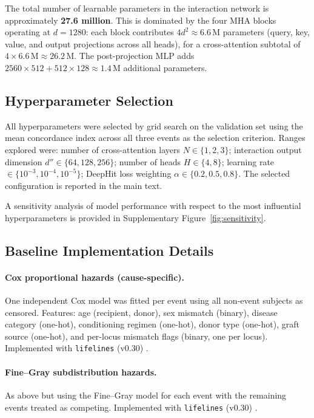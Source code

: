 \documentclass[12pt]{article}
\begin{document}
The total number of learnable parameters in the interaction network is
approximately \textbf{27.6 million}.  This is dominated by the four MHA
blocks operating at $d = 1280$: each block contributes
$4d^2 \approx 6.6\,\text{M}$ parameters (query, key, value, and output
projections across all heads), for a cross-attention subtotal of
$4 \times 6.6\,\text{M} \approx 26.2\,\text{M}$.  The post-projection
MLP adds $2560 \times 512 + 512 \times 128 \approx 1.4\,\text{M}$
additional parameters.

\subsection{Hyperparameter Selection}

All hyperparameters were selected by grid search on the validation set using
the mean concordance index across all three events as the selection criterion.
Ranges explored were: number of cross-attention layers $N \in \{1, 2, 3\}$;
interaction output dimension $d'' \in \{64, 128, 256\}$; number of heads
$H \in \{4, 8\}$; learning rate $\in \{10^{-3}, 10^{-4}, 10^{-5}\}$; DeepHit
loss weighting $\alpha \in \{0.2, 0.5, 0.8\}$.  The selected configuration
is reported in the main text.

A sensitivity analysis of model performance with respect to the most
influential hyperparameters is provided in Supplementary Figure~\ref{fig:sensitivity}.

\subsection{Baseline Implementation Details}

\paragraph{Cox proportional hazards (cause-specific).}
One independent Cox model was fitted per event using all non-event subjects as
censored.  Features: age (recipient, donor), sex mismatch (binary), disease
category (one-hot), conditioning regimen (one-hot), donor type (one-hot), graft
source (one-hot), and per-locus mismatch flags (binary, one per locus).
Implemented with \texttt{lifelines} (v0.30) \citep{davidson2019lifelines}.

\paragraph{Fine--Gray subdistribution hazards.}
As above but using the Fine--Gray model for each event with the remaining
events treated as competing.  Implemented with \texttt{lifelines} (v0.30) \citep{davidson2019lifelines}.
\end{document}
